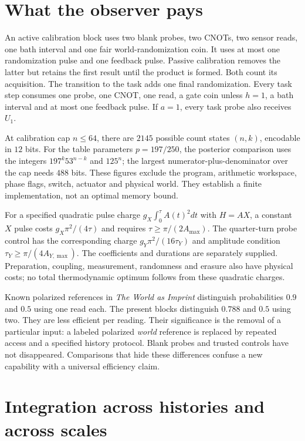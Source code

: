 \documentclass[11pt,a4paper]{article}
\begin{document}
\section{What the observer pays}

An active calibration block uses two blank probes, two CNOTs, two sensor reads, one bath interval and one fair world-randomization coin. It uses at most one randomization pulse and one feedback pulse. Passive calibration removes the latter but retains the first result until the product is formed. Both count its acquisition. The transition to the task adds one final randomization. Every task step consumes one probe, one CNOT, one read, a gate coin unless $h=1$, a bath interval and at most one feedback pulse. If $a=1$, every task probe also receives $U_1$.

At calibration cap $n\le64$, there are $2145$ possible count states $(n,k)$, encodable in $12$ bits. For the table parameters $p=197/250$, the posterior comparison uses the integers $197^k53^{n-k}$ and $125^n$; the largest numerator-plus-denominator over the cap needs $488$ bits. These figures exclude the program, arithmetic workspace, phase flags, switch, actuator and physical world. They establish a finite implementation, not an optimal memory bound.

For a specified quadratic pulse charge $g_X\int_0^\tau A(t)^2dt$ with $H=A X$, a constant $X$ pulse costs $g_X\pi^2/(4\tau)$ and requires $\tau\ge\pi/(2A_{\max})$. The quarter-turn probe control has the corresponding charge $g_Y\pi^2/(16\tau_Y)$ and amplitude condition $\tau_Y\ge\pi/(4A_{Y,\max})$. The coefficients and durations are separately supplied. Preparation, coupling, measurement, randomness and erasure also have physical costs; no total thermodynamic optimum follows from these quadratic charges.

Known polarized references in \emph{The World as Imprint} distinguish probabilities $0.9$ and $0.5$ using one read each. The present blocks distinguish $0.788$ and $0.5$ using two. They are less efficient per reading. Their significance is the removal of a particular input: a labeled polarized \emph{world} reference is replaced by repeated access and a specified history protocol. Blank probes and trusted controls have not disappeared. Comparisons that hide these differences confuse a new capability with a universal efficiency claim.

\section{Integration across histories and across scales}
\end{document}
